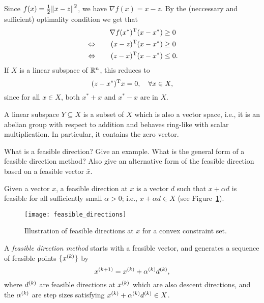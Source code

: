 \documentclass{article}
\begin{document}
Since \(f(x) = \frac{1}{2} \enVert{x - z}^2\), we have \(\nabla f(x) = x - z\).  By the (neccessary
and sufficient) optimality condition we get that
\begin{alignat*}{2}
  &\quad & \T{\nabla f(x^*)}(x - x^*) &\geq 0 \\
  &\Leftrightarrow\quad & \T{(x - z)}(x - x^*) &\geq 0 \\
  &\Leftrightarrow\quad & \T{(z - x)}(x - x^*) &\leq 0.
\end{alignat*}
If \(X\) is a linear subspace of \(\RR^n\), this reduces to
\begin{equation*}
  \T{(z - x^*)}x = 0, \quad\forall x \in X,
\end{equation*}
since for all \(x \in X\), both \(x^* + x\) and \(x^* - x\) are in \(X\).

A linear subspace \(Y \subseteq X\) is a subset of \(X\) which is also a vector space, i.e., it is
an abelian group with respect to addition and behaves ring-like with scalar multiplication.  In
particular, it contains the zero vector.

\begin{question}
  What is a feasible direction? Give an example.  What is the general form of a feasible direction
  method? Also give an alternative form of the feasible direction based on a feasible vector
  \(\bar{x}\).
\end{question}

Given a vector \(x\), a feasible direction at \(x\) is a vector \(d\) such that \(x + \alpha d\) is
feasible for all sufficiently small \(\alpha > 0\); i.e., \(x + \alpha d \in X\) (see
Figure~\ref{fig:feasible-directions}).

\begin{figure}[H]
  \centering
  \texttt{[image: feasible\_directions]}
  \caption{Illustration of feasible directions at \(x\) for a convex constraint
    set.\label{fig:feasible-directions}}
\end{figure}

A \emph{feasible direction method} starts with a feasible vector, and generates a sequence of
feasible points \(\{\kth{x}\}\) by
\begin{equation*}
  \kth[k+1]{x} = \kth{x} + \kth{\alpha}\kth{d},
\end{equation*}
where \(\kth{d}\) are feasible directions at \(\kth{x}\) which are also descent directions, and the
\(\kth{\alpha}\) are step sizes satisfying \(\kth{x} + \kth{\alpha} \kth{d} \in X\).
\end{document}
